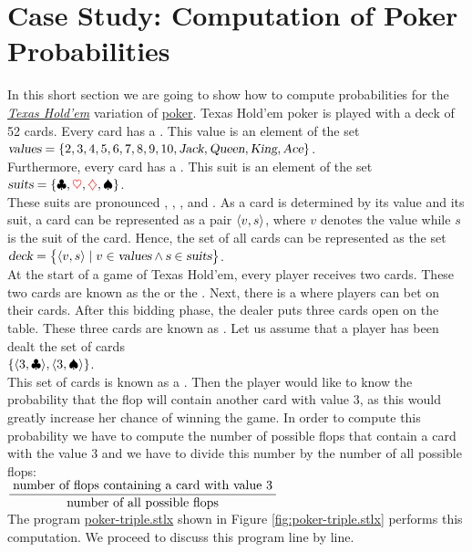 \section{Case Study: Computation of Poker Probabilities}
In this short section we are going to show how to compute probabilities for the
\href{https://en.wikipedia.org/wiki/Texas_hold_%27em}{\textsl{Texas Hold'em}} variation of 
\href{https://en.wikipedia.org/wiki/Poker}{poker}.   Texas Hold'em poker is played with a deck of 52
cards.  Every card has a .  This value is an element of the set
\\[0.2cm]
\hspace*{1.3cm} 
$\textsl{values} = \{ 2, 3, 4, 5, 6, 7, 8, 9, 10, \textsl{Jack}, \textsl{Queen}, \textsl{King}, \textsl{Ace} \}$.
\\[0.2cm]
Furthermore, every card has a .  This suit is an element of the set
\\[0.2cm]
\hspace*{1.3cm} 
$\textsl{suits} = \{ \clubsuit , \mbox{$\color{red}{\ensuremath{\heartsuit }}$}, \mbox{$\color{red}{\diamondsuit}$}, \spadesuit  \}$.
\\[0.2cm]
These suits are pronounced , , , and .
As a card is determined by its value and its suit, a card can be represented as a pair $\pair(v,s)$, where $v$
denotes the value while $s$ is the suit of the card.  Hence, the set of all cards can be represented as the set
\\[0.2cm]
\hspace*{1.3cm} 
$\textsl{deck} = \bigl\{ \pair(v,s) \mid v \in \textsl{values} \wedge \textsl{s} \in \textsl{suits} \bigr\}$.
\\[0.2cm]
At the start of a game of Texas Hold'em, every player receives two cards.  These two cards are known
as the  or the .  Next, there is a  where players can bet on their
cards.   After this bidding phase, the dealer puts three cards open on the table.  These three cards are
known as .  Let us assume that a player has been dealt the set of cards
\\[0.2cm]
\hspace*{1.3cm}
$\{ \pair(3, \club), \pair(3, \spade) \}$.
\\[0.2cm]
This set of cards is known as a .  Then the player would like to know the probability
that the flop will contain another card with value $3$, as this would greatly increase her chance of
winning the game.  In order to compute this probability we have to compute the number of possible
flops that contain a card with the value $3$ and we have to divide this number by the number of all
possible flops:
\\[0.2cm]
\hspace*{1.3cm}
$\displaystyle \frac{\;\mbox{number of flops containing a card with value $3$}\;}{\mbox{number of all possible flops}}$
\\[0.2cm]
The program
\href{https://github.com/karlstroetmann/Logik/blob/master/SetlX/poker-triple.stlx}{poker-triple.stlx}
shown in Figure \ref{fig:poker-triple.stlx} performs this computation.  We proceed to discuss this
program line by line.


